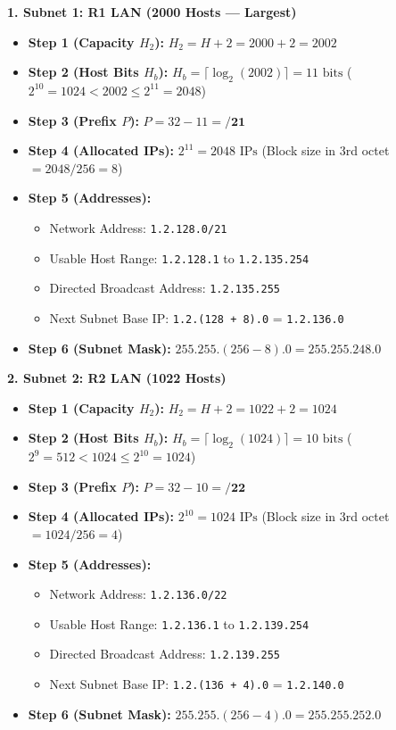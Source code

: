 \documentclass[11pt,a4paper]{article}
\begin{document}
\textbf{1. Subnet 1: R1 LAN (2000 Hosts --- Largest)}
\begin{itemize}
    \item \textbf{Step 1 (Capacity $H_2$):} $H_2 = H + 2 = 2000 + 2 = 2002$
    \item \textbf{Step 2 (Host Bits $H_b$):} $H_b = \lceil \log_2(2002) \rceil = 11\text{ bits}$ ($2^{10} = 1024 < 2002 \le 2^{11} = 2048$)
    \item \textbf{Step 3 (Prefix $P$):} $P = 32 - 11 = \mathbf{/21}$
    \item \textbf{Step 4 (Allocated IPs):} $2^{11} = 2048\text{ IPs}$ (Block size in 3rd octet $= 2048 / 256 = 8$)
    \item \textbf{Step 5 (Addresses):}
    \begin{itemize}
        \item Network Address: \texttt{1.2.128.0/21}
        \item Usable Host Range: \texttt{1.2.128.1} to \texttt{1.2.135.254}
        \item Directed Broadcast Address: \texttt{1.2.135.255}
        \item Next Subnet Base IP: \texttt{1.2.(128 + 8).0} = \texttt{1.2.136.0}
    \end{itemize}
    \item \textbf{Step 6 (Subnet Mask):} $255.255.(256 - 8).0 = \mathbf{255.255.248.0}$
\end{itemize}

\textbf{2. Subnet 2: R2 LAN (1022 Hosts)}
\begin{itemize}
    \item \textbf{Step 1 (Capacity $H_2$):} $H_2 = H + 2 = 1022 + 2 = 1024$
    \item \textbf{Step 2 (Host Bits $H_b$):} $H_b = \lceil \log_2(1024) \rceil = 10\text{ bits}$ ($2^9 = 512 < 1024 \le 2^{10} = 1024$)
    \item \textbf{Step 3 (Prefix $P$):} $P = 32 - 10 = \mathbf{/22}$
    \item \textbf{Step 4 (Allocated IPs):} $2^{10} = 1024\text{ IPs}$ (Block size in 3rd octet $= 1024 / 256 = 4$)
    \item \textbf{Step 5 (Addresses):}
    \begin{itemize}
        \item Network Address: \texttt{1.2.136.0/22}
        \item Usable Host Range: \texttt{1.2.136.1} to \texttt{1.2.139.254}
        \item Directed Broadcast Address: \texttt{1.2.139.255}
        \item Next Subnet Base IP: \texttt{1.2.(136 + 4).0} = \texttt{1.2.140.0}
    \end{itemize}
    \item \textbf{Step 6 (Subnet Mask):} $255.255.(256 - 4).0 = \mathbf{255.255.252.0}$
\end{itemize}
\end{document}
